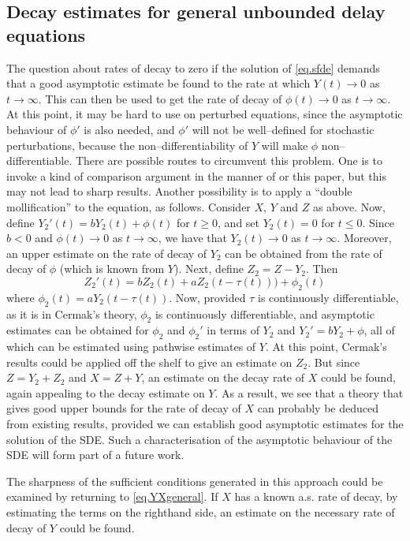 \documentclass[a4paper,10pt,reqno]{amsart}
\numberwithin{equation}{section}
\theoremstyle{definition}
\theoremstyle{remark}
\DeclareMathOperator{\1}{\mathbbm 1}
\begin{document}
\subsection{Decay estimates for general unbounded delay equations}
The question about rates of decay to zero if the solution of \eqref{eq.sfde} demands that a good asymptotic estimate be found to the rate at which $Y(t)\to 0$ as $t\to\infty$. This can then be used to get the rate of decay of $\phi(t)\to 0$ as $t\to\infty$. At this point, it may be hard to use \cite[Theorem 2.3]{cermak} on perturbed equations, since the asymptotic behaviour of $\phi'$ is also needed, and $\phi'$ will not be well--defined for stochastic perturbations, because the non--differentiability of $Y$ will make $\phi$ non--differentiable. There are possible routes to circumvent this problem. One is to invoke a kind of comparison argument in the manner of \cite{AppBuck10} or this paper, but this may not lead to sharp results. Another possibility is to apply a ``double mollification'' to the equation, as follows. Consider $X$, $Y$ and $Z$ as above. Now, define 
$Y_2'(t)=bY_2(t)+\phi(t)$ for $t\geq 0$,
and set $Y_2(t)=0$ for $t\leq 0$. Since $b<0$ and $\phi(t)\to 0$ as $t\to\infty$, we have that $Y_2(t)\to 0$ as $t\to\infty$. Moreover, an upper estimate on the rate of decay of $Y_2$ can be obtained from the rate of decay of $\phi$ (which is known from $Y$). Next, define $Z_2=Z-Y_2$. Then 
\[
Z_2'(t)= bZ_2(t)+aZ_2(t-\tau(t)))+\phi_2(t)
\]
where $\phi_2(t)=aY_2(t-\tau(t))$. Now, provided $\tau$ is continuously differentiable, as it is in Cermak's theory, $\phi_2$ is continuously differentiable, and asymptotic estimates can be obtained for $\phi_2$ and $\phi_2'$ in terms of $Y_2$ and $Y_2'=bY_2+\phi$, all of which can be estimated using pathwise estimates of $Y$. At this point, Cermak's results could be applied off the shelf to give an estimate on $Z_2$. But since $Z=Y_2+Z_2$ and $X=Z+Y$, an estimate on the decay rate of $X$ could be found, again appealing to the decay estimate on $Y$. As a result, we see that a theory that gives good upper bounds for the rate of decay of $X$ can probably be deduced from existing results, provided we can establish good asymptotic estimates for the solution of the SDE. Such a characterisation of the asymptotic behaviour of the SDE will form part of a future work.   

The sharpness of the sufficient conditions generated in this approach could be examined by returning to \eqref{eq.YXgeneral}. If
$X$ has a known a.s. rate of decay, by estimating the terms on the righthand side, an estimate on the necessary rate of decay of $Y$ could be found. 
\end{document}
